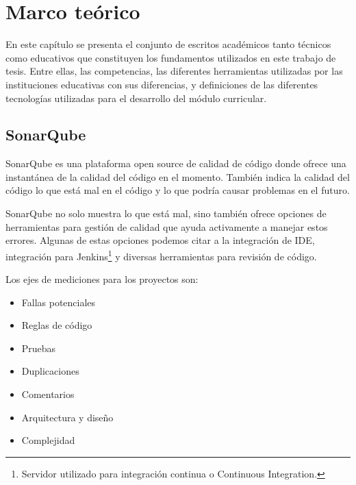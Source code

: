 \chapter{Marco teórico} %
En este capítulo se presenta el conjunto de escritos académicos tanto técnicos como educativos que constituyen los fundamentos utilizados en este trabajo de tesis. Entre ellas, las competencias, las diferentes herramientas utilizadas por las instituciones educativas con sus diferencias, y definiciones de las diferentes tecnologías utilizadas para el desarrollo del módulo curricular.

\label{capitulo2} %












\section{SonarQube}
SonarQube es una plataforma open source de calidad de código donde ofrece una instantánea de la calidad del código en el momento. También indica la calidad del código lo que está mal en el código y lo que podría causar problemas en el futuro.

SonarQube no solo muestra lo que está mal, sino también ofrece opciones de herramientas para gestión de calidad que ayuda activamente a manejar estos errores. Algunas de estas opciones podemos citar a la integración de IDE, integración para Jenkins\footnote{Servidor utilizado para integración continua o Continuous Integration.} y diversas herramientas para revisión de código.

Los ejes de mediciones para los proyectos son:
\begin{itemize}
	\item Fallas potenciales
	\item Reglas de código
	\item Pruebas
	\item Duplicaciones
	\item Comentarios
	\item Arquitectura y diseño
	\item Complejidad
\end{itemize}

